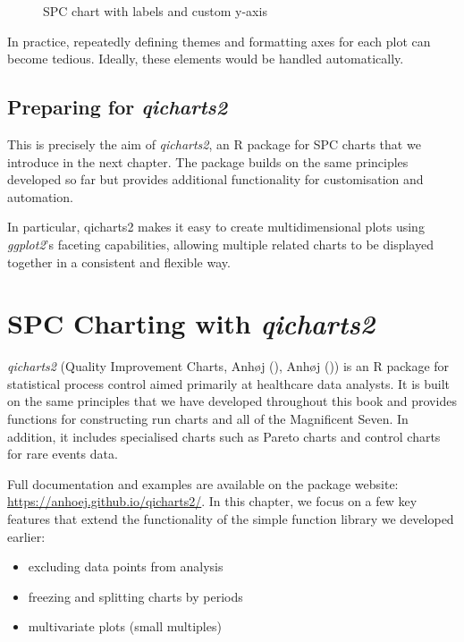 \documentclass[
]{book}
\makeatletter
\newcommand*\pandocbounded[1]{%
  \sbox\pandoc@box{#1}%
  \Gscale@div\@tempa{\textheight}{\dimexpr\ht\pandoc@box+\dp\pandoc@box\relax}%
  \Gscale@div\@tempb{\linewidth}{\wd\pandoc@box}%
  \ifdim\@tempb\p@<\@tempa\p@\let\@tempa\@tempb\fi%
  \ifdim\@tempa\p@<\p@\scalebox{\@tempa}{\usebox\pandoc@box}%
  \else\usebox{\pandoc@box}%
  \fi%
}
\providecommand{\tightlist}{%
  \setlength{\itemsep}{0pt}\setlength{\parskip}{0pt}}
\makeatother
\begin{document}
\begin{figure}
\centering
\pandocbounded{}
\caption{SPC chart with labels and custom y-axis}
\end{figure}

In practice, repeatedly defining themes and formatting axes for each
plot can become tedious. Ideally, these elements would be handled
automatically.

\section{\texorpdfstring{Preparing for
\emph{qicharts2}}{Preparing for qicharts2}}\label{preparing-for-qicharts2}

This is precisely the aim of \emph{qicharts2}, an R package for SPC
charts that we introduce in the next chapter. The package builds on the
same principles developed so far but provides additional functionality
for customisation and automation.

In particular, qicharts2 makes it easy to create multidimensional plots
using \emph{ggplot2}'s faceting capabilities, allowing multiple related
charts to be displayed together in a consistent and flexible way.

\chapter{\texorpdfstring{SPC Charting with
\emph{qicharts2}}{SPC Charting with qicharts2}}\label{qicharts}

\emph{qicharts2} (Quality Improvement Charts, Anhøj
(), Anhøj
()) is an R package for statistical
process control aimed primarily at healthcare data analysts. It is built
on the same principles that we have developed throughout this book and
provides functions for constructing run charts and all of the
Magnificent Seven. In addition, it includes specialised charts such as
Pareto charts and control charts for rare events data.

Full documentation and examples are available on the package website:
\url{https://anhoej.github.io/qicharts2/}. In this chapter, we focus on
a few key features that extend the functionality of the simple function
library we developed earlier:

\begin{itemize}
\tightlist
\item
  excluding data points from analysis
\item
  freezing and splitting charts by periods
\item
  multivariate plots (small multiples)
\end{itemize}
\end{document}
